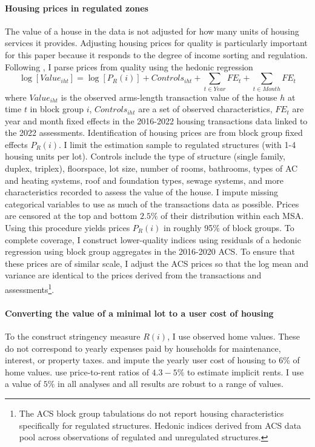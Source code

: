 \documentclass[12pt]{article}
\begin{document}
\paragraph*{Housing prices in regulated zones}\label{Calibration:HousingPrices} The value of a house in the data is not adjusted for how many units of housing services it provides. Adjusting housing prices for quality is particularly important for this paper because it responds to the degree of income sorting and regulation. Following \cite{BSH}, I parse prices from quality using the hedonic regression
\begin{equation}\label{hedonicIndex}
	\log[Value_{iht}] = \log[P_{R}(i)] + Controls_{iht} + \sum_{t \in Year}FE_{t} + \sum_{t \in Month}FE_{t}
\end{equation} 
where $Value_{iht}$ is the observed arms-length transaction value of the house $h$ at time $t$ in block group $i$, $Controls_{iht}$ are a set of observed characteristics, $FE_{t}$ are year and month fixed effects in the 2016-2022 housing transactions data linked to the 2022 assessments. Identification of housing prices are from block group fixed effects $P_{R}(i)$. I limit the estimation sample to regulated structures (with 1-4 housing units per lot). Controls include the type of structure (single family, duplex, triplex), floorspace, lot size, number of rooms, bathrooms, types of AC and heating systems, roof and foundation types, sewage systems, and more characteristics recorded to assess the value of the house. I impute missing categorical variables to use as much of the transactions data as possible. Prices are censored at the top and bottom $2.5\%$ of their distribution within each MSA. Using this procedure yields prices $P_{R}(i)$ in roughly 95\% of block groups. To complete coverage, I construct lower-quality indices using residuals of a hedonic regression using block group aggregates in the 2016-2020 ACS. To ensure that these prices are of similar scale, I adjust the ACS prices so that the log mean and variance are identical to the prices derived from the transactions and assessments\footnote{The ACS block group tabulations do not report housing characteristics specifically for regulated structures. Hedonic indices derived from ACS data pool across observations of regulated and unregulated structures.}.

\paragraph*{Converting the value of a minimal lot to a user cost of housing} To the construct stringency measure $R(i)$, I use observed home values. These do not correspond to yearly expenses paid by households for maintenance, interest, or property taxes. \cite{AttanasioPistaferri} and \cite{straub2019} impute the yearly user cost of housing to $6\%$ of home values. \cite{Coutureetal} use price-to-rent ratios of $4.3 - 5\%$ to estimate implicit rents. I use a value of $5\%$ in all analyses and all results are robust to a range of values.  
\end{document}
